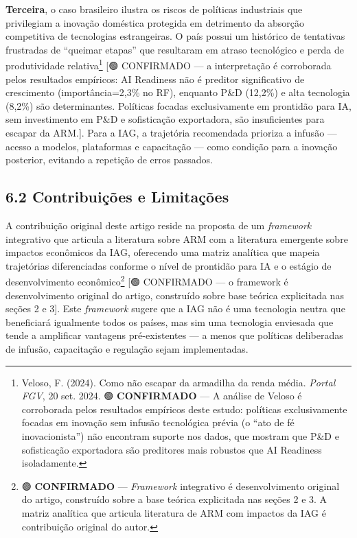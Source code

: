 \documentclass[
  brazilian,
  12pt,
]{article}
\begin{document}
\textbf{Terceira}, o caso brasileiro ilustra os riscos de políticas industriais que privilegiam a inovação doméstica protegida em detrimento da absorção competitiva de tecnologias estrangeiras. O país possui um histórico de tentativas frustradas de ``queimar etapas'' que resultaram em atraso tecnológico e perda de produtividade relativa\footnote{Veloso, F. (2024). Como não escapar da armadilha da renda média. \emph{Portal FGV}, 20 set. 2024. 🟢 \textbf{CONFIRMADO} --- A análise de Veloso é corroborada pelos resultados empíricos deste estudo: políticas exclusivamente focadas em inovação sem infusão tecnológica prévia (o ``ato de fé inovacionista'') não encontram suporte nos dados, que mostram que P\&D e sofisticação exportadora são preditores mais robustos que AI Readiness isoladamente.} {[}🟢 CONFIRMADO --- a interpretação é corroborada pelos resultados empíricos: AI Readiness não é preditor significativo de crescimento (importância=2,3\% no RF), enquanto P\&D (12,2\%) e alta tecnologia (8,2\%) são determinantes. Políticas focadas exclusivamente em prontidão para IA, sem investimento em P\&D e sofisticação exportadora, são insuficientes para escapar da ARM.{]}. Para a IAG, a trajetória recomendada prioriza a infusão --- acesso a modelos, plataformas e capacitação --- como condição para a inovação posterior, evitando a repetição de erros passados.

\subsection{6.2 Contribuições e Limitações}\label{contribuiuxe7uxf5es-e-limitauxe7uxf5es}

A contribuição original deste artigo reside na proposta de um \emph{framework} integrativo que articula a literatura sobre ARM com a literatura emergente sobre impactos econômicos da IAG, oferecendo uma matriz analítica que mapeia trajetórias diferenciadas conforme o nível de prontidão para IA e o estágio de desenvolvimento econômico\footnote{🟢 \textbf{CONFIRMADO} --- \emph{Framework} integrativo é desenvolvimento original do artigo, construído sobre a base teórica explicitada nas seções 2 e 3. A matriz analítica que articula literatura de ARM com impactos da IAG é contribuição original do autor.} {[}🟢 CONFIRMADO --- o framework é desenvolvimento original do artigo, construído sobre base teórica explicitada nas seções 2 e 3{]}. Este \emph{framework} sugere que a IAG não é uma tecnologia neutra que beneficiará igualmente todos os países, mas sim uma tecnologia enviesada que tende a amplificar vantagens pré-existentes --- a menos que políticas deliberadas de infusão, capacitação e regulação sejam implementadas.
\end{document}

